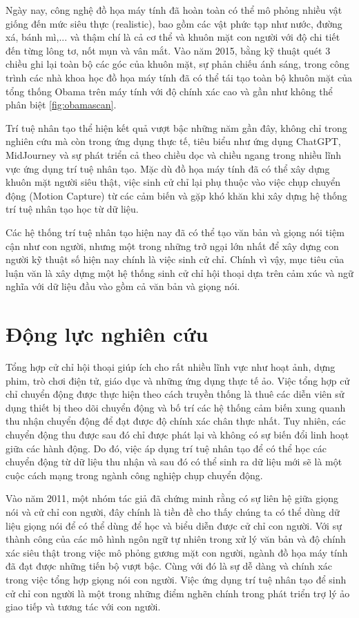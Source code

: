 Ngày nay, công nghệ đồ họa máy tính đã hoàn toàn có thể mô phỏng nhiều vật giống đến mức siêu thực (realistic), bao gồm các vật phức tạp như nước, đường xá, bánh mì,...  và thậm chí là cả cơ thể và khuôn mặt con người với độ chi tiết đến từng lông tơ, nốt mụn và vân mắt. 
Vào năm 2015, bằng kỹ thuật quét 3 chiều ghi lại toàn bộ các góc của khuôn mặt, sự phản chiếu ánh sáng, trong công trình \cite{metallo2015scanning}
các nhà khoa học đồ họa máy tính đã có thể tái tạo toàn bộ khuôn mặt của tổng thống Obama trên máy tính với độ chính xác cao và gần như không thể phân biệt \autoref{fig:obamascan}.

Trí tuệ nhân tạo thể hiện kết quả vượt bậc những năm gần đây, không chỉ trong nghiên cứu mà còn trong ứng dụng thực tế, tiêu biểu như ứng dụng ChatGPT, MidJourney và sự phát triển cả theo chiều dọc và chiều ngang trong nhiều lĩnh vực ứng dụng trí tuệ nhân tạo. Mặc dù đồ họa máy tính đã có thể xây dựng khuôn mặt người siêu thật, việc sinh cử chỉ lại phụ thuộc vào việc chụp chuyển động (Motion Capture) từ các cảm biến và gặp khó khăn khi xây dựng hệ thống trí tuệ nhân tạo học từ dữ liệu.

Các hệ thống trí tuệ nhân tạo hiện nay đã có thể tạo văn bản và giọng nói tiệm cận như con người, nhưng một trong những trở ngại lớn nhất để xây dựng con người kỹ thuật số hiện nay chính là việc sinh cử chỉ. Chính vì vậy, mục tiêu của luận văn là xây dựng một hệ thống sinh cử chỉ hội thoại dựa trên cảm xúc và ngữ nghĩa với dữ liệu đầu vào gồm cả văn bản và giọng nói.

\section{Động lực nghiên cứu}

Tổng hợp cử chỉ hội thoại giúp ích cho rất nhiều lĩnh vực như hoạt ảnh, dựng phim, trò chơi điện tử, giáo dục và những ứng dụng thực tế ảo. Việc tổng hợp cử chỉ chuyển động được thực hiện theo cách truyền thống là thuê các diễn viên sử dụng thiết bị theo dõi chuyển động và bố trí các hệ thống cảm biến xung quanh thu nhận chuyển động để đạt được độ chính xác chân thực nhất. Tuy nhiên, các chuyển động thu được sau đó chỉ được phát lại và không có sự biến đổi linh hoạt giữa các hành động. Do đó, việc áp dụng trí tuệ nhân tạo để có thể học các chuyển động từ dữ liệu thu nhận và sau đó có thể sinh ra dữ liệu mới sẽ là một cuộc cách mạng trong ngành công nghiệp chụp chuyển động.

Vào năm 2011, một nhóm tác giả \cite{bergmann2011relation} đã chứng minh rằng có sự liên hệ giữa giọng nói và cử chỉ con người, đây chính là tiền đề cho thấy chúng ta có thể dùng dữ liệu giọng nói để có thể dùng để học và biểu diễn được cử chỉ con người.
Với sự thành công của các mô hình ngôn ngữ tự nhiên trong xử lý văn bản và độ chính xác siêu thật trong việc mô phỏng gương mặt con người, ngành đồ họa máy tính đã đạt được những tiến bộ vượt bậc. Cùng với đó là sự dễ dàng và chính xác trong việc tổng hợp giọng nói con người.
Việc ứng dụng trí tuệ nhân tạo để sinh cử chỉ con người là một trong những điểm nghẽn chính trong phát triển trợ lý ảo giao tiếp và tương tác với con người.

